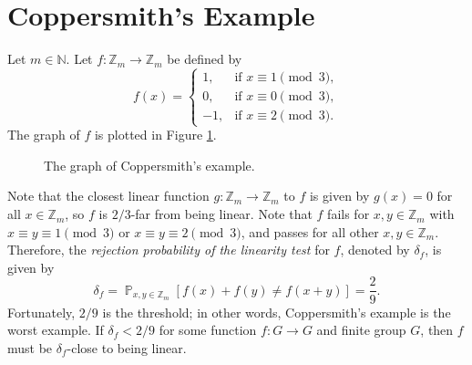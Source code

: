 \documentclass[letterpaper, reqno,11pt]{article}
\newcommand{\ZZ}{\mathbb{Z}}
\newcommand{\NN}{\mathbb{N}}
\newcommand{\PP}{\mathop{{}\mathbb{P}}}
\begin{document}
\section{Coppersmith's Example}

Let $m \in \NN$. Let $f : \ZZ_m \to \ZZ_m$ be defined by
$$ f(x) = \left\{
  \begin{array}{ll}
    1, & \text{if $x \equiv 1 \pmod{3}$}, \\
    0, & \text{if $x \equiv 0 \pmod{3}$}, \\
    -1, & \text{if $x \equiv 2 \pmod{3}$}.
  \end{array}
\right. $$
The graph of $f$ is plotted in Figure \ref{fig:coppersmith}.

\begin{figure}[h]
  \centering
  \caption{The graph of Coppersmith's example.}
  \label{fig:coppersmith}
\end{figure}

Note that the closest linear function $g : \ZZ_m \to \ZZ_m$ to $f$ is given by $g(x) = 0$ for all $x \in \ZZ_m$, so $f$ is $2/3$-far from being linear. Note that $f$ fails for $x, y \in \ZZ_m$ with $x \equiv y \equiv 1 \pmod{3}$ or $x \equiv y \equiv 2 \pmod{3}$, and passes for all other $x, y \in \ZZ_m$. Therefore, the \emph{rejection probability of the linearity test} for $f$, denoted by $\delta_f$, is given by
$$ \delta_f = \PP_{x, y \in \ZZ_m}[f(x) + f(y) \neq f(x + y)] = \frac{2}{9}. $$
Fortunately, $2/9$ is the threshold; in other words, Coppersmith's example is the worst example. If $\delta_f < 2/9$ for some function $f : G \to G$ and finite group $G$, then $f$ must be $\delta_f$-close to being linear.
\end{document}
